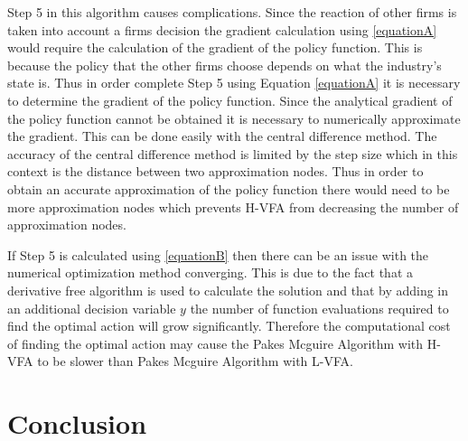 \documentclass[12pt]{article}
\begin{document}
Step 5 in this algorithm causes complications. Since the reaction of other firms is taken into account a firms decision the gradient calculation using \eqref{equationA} would require the calculation of the gradient of the policy function. This is because the policy that the other firms choose depends on what the industry's state is. Thus in order complete Step 5 using Equation \eqref{equationA} it is necessary to determine the gradient of the policy function. Since the analytical gradient of the policy function cannot be obtained it is necessary to numerically approximate the gradient. This can be done easily with the central difference method. The accuracy of the central difference method is limited by the step size which in this context is the distance between two approximation nodes. Thus in order to obtain an accurate approximation of the policy function there would need to be more approximation nodes which prevents H-VFA from decreasing the number of approximation nodes.

If Step 5 is calculated using \eqref{equationB} then there can be an issue with the numerical optimization method converging. This is due to the fact that a derivative free algorithm is used to calculate the solution and that by adding in an additional decision variable $y$ the number of function evaluations required to find the optimal action will grow significantly. Therefore the computational cost of finding the optimal action may cause the Pakes Mcguire Algorithm with H-VFA to be slower than Pakes Mcguire Algorithm with L-VFA.




\section{Conclusion}
\label{con}

\end{document}
